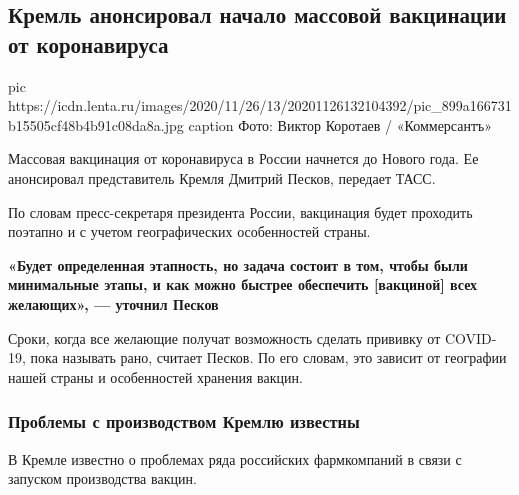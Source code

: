  
 
 
 
 
 
\subsection{Кремль анонсировал начало массовой вакцинации от коронавируса}
\label{sec:26_11_2020.news.ru.lenta_ru.1.mass_covid_vaccination}


\ifcmt
pic https://icdn.lenta.ru/images/2020/11/26/13/20201126132104392/pic_899a166731b15505cf48b4b91c08da8a.jpg
caption Фото: Виктор Коротаев / «Коммерсантъ»
\fi

Массовая вакцинация от коронавируса в России начнется до Нового года. Ее
анонсировал представитель Кремля Дмитрий Песков, передает ТАСС.

По словам пресс-секретаря президента России, вакцинация будет проходить
поэтапно и с учетом географических особенностей страны.

\begin{leftbar}
	\bfseries
	«Будет определенная этапность, но задача состоит в том, чтобы были
				минимальные этапы, и как можно быстрее обеспечить [вакциной] всех
				желающих», — уточнил Песков
\end{leftbar}

Сроки, когда все желающие получат возможность сделать прививку от COVID-19,
пока называть рано, считает Песков. По его словам, это зависит от географии
нашей страны и особенностей хранения вакцин.  

\subsubsection{Проблемы с производством Кремлю известны}

В Кремле известно о проблемах ряда российских фармкомпаний в связи с запуском
производства вакцин.

